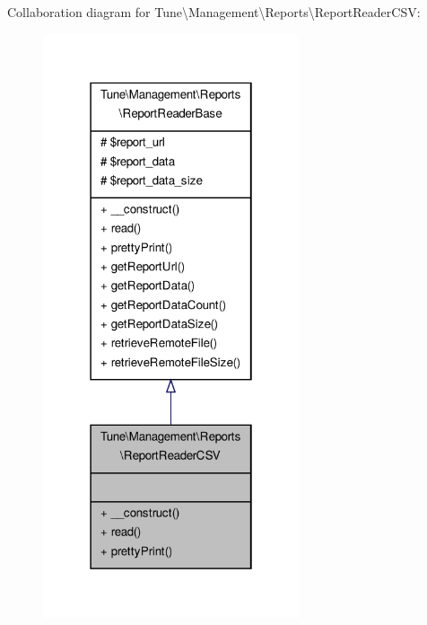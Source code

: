 Collaboration diagram for Tune\textbackslash{}Management\textbackslash{}Reports\textbackslash{}Report\-Reader\-C\-S\-V\-:
\nopagebreak
\begin{figure}[H]
\begin{center}
\leavevmode
\includegraphics[width=214pt]{classTune_1_1Management_1_1Reports_1_1ReportReaderCSV__coll__graph}
\end{center}
\end{figure}
